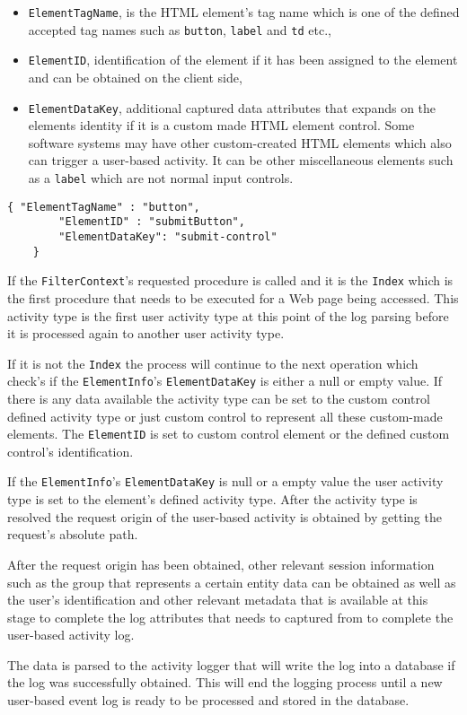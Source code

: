 \begin{itemize}
	\item \texttt{ElementTagName}, is the HTML element's tag name which is one of the defined accepted tag names such as \texttt{button}, \texttt{label} and \texttt{td} etc.,
	\item \texttt{ElementID}, identification of the element if it has been assigned to the element and can be obtained on the client side,
	\item \texttt{ElementDataKey}, additional captured data attributes that expands on the elements identity if it is a custom made HTML element control. Some software systems may have other custom-created HTML elements which also can trigger a user-based activity. It can be other miscellaneous elements such as a \texttt{label} which are not normal input controls.
\end{itemize}

\clearpage

\begin{lstlisting}[style=json, caption={\textit{Element properties JSON}}, label={fig:Ch2_ElementInfo}] 
	{ "ElementTagName" : "button",
		"ElementID" : "submitButton",
		"ElementDataKey": "submit-control"		
	}
\end{lstlisting}

If the \texttt{FilterContext}'s requested procedure is called and it is the \texttt{Index} which is the first procedure that needs to be executed for a Web page being accessed. This activity type is the first user activity type at this point of the log parsing before it is processed again to another user activity type. \par If it is not the \texttt{Index} the process will continue to the next operation which check's if the \texttt{ElementInfo}'s \texttt{ElementDataKey} is either a null or empty value. If there is any data available the activity type can be set to the custom control defined activity type or just custom control to represent all these custom-made elements. The \texttt{ElementID} is set to custom control element or the defined custom control's identification. \par If the \texttt{ElementInfo}'s \texttt{ElementDataKey} is null or a empty value the user activity type is set to the element's defined activity type. After the activity type is resolved the request origin of the user-based activity is obtained by getting the request's absolute path.\par After the request origin has been obtained, other relevant session information such as the group that represents a certain entity data can be obtained as well as the user's identification and other relevant metadata that is available at this stage to complete the log attributes that needs to captured from  to complete the user-based activity log.\par The data is parsed to the activity logger that will write the log into a database if the log was successfully obtained. This will end the logging process until a new user-based event log is ready to be processed and stored in the database.

